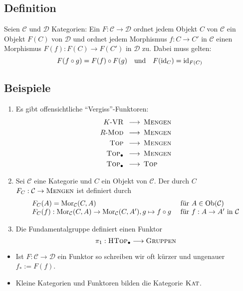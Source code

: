 \subsection[Definition: Funktor]{Definition} %
\label{sub:14}
Seien $\mathcal{C}$ und $\mathcal{D}$ Kategorien: Ein  $F : \mathcal{C} \to \mathcal{D}$ ordnet jedem Objekt $C$ von $\mathcal{C}$ ein Objekt $F(C)$ von 
$\mathcal{D}$ und ordnet jedem Morphismus $f : C \to C'$ in $\mathcal{C}$ einen Morphismus $F(f) : F(C) \to F(C')$ in $\mathcal{D}$ zu. Dabei muss gelten:
\[
	F(f \circ g) = F(f) \circ F(g) \quad \text{und} \quad F(\operatorname{id}_C) = \operatorname{id}_{F(C)}
\] 

\subsection[Beispiele für Funktoren]{Beispiele} %
\label{sub:15}
\begin{enumerate}[(1)]
	\item Es gibt offensichtliche \enquote{Vergiss}-Funktoren:
	\begin{align*}
		K\text{-}\textsc{VR} \enspace\longrightarrow & \enspace\textsc{Mengen} \\
		R\text{-}\textsc{Mod} \enspace\longrightarrow & \enspace\textsc{Mengen} \\
		\textsc{Top} \enspace\longrightarrow & \enspace\textsc{Mengen} \\
		\textsc{Top}_\bullet \enspace\longrightarrow & \enspace\textsc{Mengen} \\
		\textsc{Top}_\bullet \enspace\longrightarrow & \enspace \textsc{Top}
	\end{align*}
	\item Sei $\mathcal{C}$ eine Kategorie und $C$ ein Objekt von $\mathcal{C}$. Der durch $C$  
	$F_C : \mathcal{C} \to \textsc{Mengen}$ ist definiert durch 
	\[
		\begin{array}{ll}
			F_C(A) = \operatorname{Mor}_\mathcal{C}(C,A) &\text{ für } A \in  \operatorname{Ob}(\mathcal{C}) \\
			F_C(f)  : \operatorname{Mor}_\mathcal{C}(C,A) \to \operatorname{Mor}_\mathcal{C}(C,A'), g \mapsto f \circ  g &\text{ für } f : A \to A' \text{ in } \mathcal{C}
		\end{array}
	\]
	\item Die Fundamentalgruppe definiert einen Funktor
	\[
		\pi_1 : \textsc{HTop}_\bullet \longrightarrow \textsc{Gruppen}
	\]
\end{enumerate}
\begin{itemize}
	\item Ist $F : \mathcal{C} \to \mathcal{D}$ ein Funktor so schreiben wir oft kürzer und ungenauer $f_* := F(f)$.
	\item Kleine Kategorien und Funktoren bilden die Kategorie $\textsc{Kat}$.
\end{itemize}

